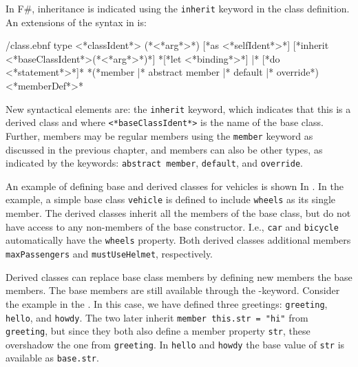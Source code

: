 \documentclass[fsharpnotes.tex]{subfiles}
\begin{document}
In F\#, inheritance is indicated using the \lstinline[language=syntax]{inherit} keyword in the class definition. An extensions of the syntax in  is:
%
\begin{verbatimwrite}{\ebnf/class.ebnf}
type <*classIdent*> ({*<*arg*>*}) [*as <*selfIdent*>*] 
  [*inherit <*baseClassIdent*>({*<*arg*>*})*]
  {*[*let <*binding*>*] |* [*do <*statement*>*]*}
  {*(*member |* abstract member |* default |* override*) <*memberDef*>*}
\end{verbatimwrite}
%
New syntactical elements are: the  \lstinline{inherit} keyword, which indicates that this is a derived class and where \lstinline[language=syntax]{<*baseClassIdent*>} is the name of the base class. Further, members may be regular members using the \lstinline{member} keyword as discussed in the previous chapter, and members can also be other types, as indicated by the keywords: \lstinline{abstract member}, \lstinline{default}, and \lstinline{override}.

An example of defining base and derived classes for vehicles is shown In .
%
%
In the example, a simple base class \lstinline{vehicle} is defined to include \lstinline{wheels} as its single member. The derived classes inherit all the members of the base class, but do not have access to any non-members of the base constructor. I.e., \lstinline{car} and \lstinline{bicycle} automatically have the \lstinline{wheels} property. Both derived classes additional members \lstinline{maxPassengers} and \lstinline{mustUseHelmet}, respectively.

Derived classes can replace base class members by defining new members  the base members. The base members are still available through the -keyword. Consider the example in the .
%
%
In this case, we have defined three greetings: \lstinline{greeting}, \lstinline{hello}, and \lstinline{howdy}. The two later inherit \lstinline{member this.str = "hi"} from \lstinline{greeting}, but since they both also define a member property \lstinline{str}, these overshadow the one from \lstinline{greeting}. In \lstinline{hello} and \lstinline{howdy} the base value of \lstinline{str} is available as \lstinline{base.str}.
\end{document}
